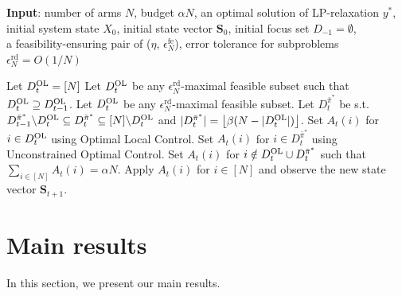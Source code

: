 \documentclass[11pt,letterpaper]{article}
\theoremstyle{plain}
\theoremstyle{definition}
\theoremstyle{remark}
\newcommand{\ve}[1]{\bm{#1}}
\newcommand{\veS}{\ve{S}}
\newcommand{\sumN}{\sum_{i\in[N]}}
\newcommand{\pibar}{{\sysbar{\pi}}}
\newcommand{\pibs}{{\pibar^*}}
\newcommand{\sysbar}[1]{\bar{#1}}
\newcommand{\errfe}{\epsilon_N^{\text{fe}}}
\newcommand{\errtol}{\epsilon_N^{\text{rd}}}
\newcommand{\Da}{D^{\pibs}}
\newcommand{\Db}{D^{\textup{OL}}}
\newcommand{\slk}{\delta}
\begin{document}
\begin{algorithm}[t] 
\caption{Two-Set Policy}
\label{alg:two-set}
\hspace*{\algorithmicindent} \textbf{Input}: number of arms $N$, budget $\alpha N$, an optimal solution of LP-relaxation $y^*$, \\
\hspace*{\algorithmicindent} \hspace{0.37in} initial system state $X_0$, initial state vector $\veS_0$, initial focus set $D_{-1}=\emptyset$, \\
\hspace*{\algorithmicindent} \hspace{0.37in} a feasibility-ensuring pair of ($\eta$, $\errfe$), error tolerance for subproblems $\errtol = O(1/N)$
\begin{algorithmic}[1]
        \If{$\slk(X_t, [N]) \geq 0$} 
        \label{alg:two-set:update-db-step-begin}
            \State Let $\Db_t = [N]$
        \ElsIf{$\slk(X_t, \Db_{t-1}) \geq 0$} 
            \State Let $\Db_t$ be any $\errtol$-maximal feasible subset such that $\Db_t \supseteq \Db_{t-1}$. 
        \Else
            \State Let $\Db_t$ be any $\errtol$-maximal feasible subset. 
        \label{alg:two-set:update-db-step-end}
        \EndIf
        \State Let $\Da_{t}$ be s.t. $\Da_{t-1} \backslash \Db_{t} \subseteq \Da_{t} \subseteq [N] \backslash \Db_t$ and $|\Da_{t}| = \big\lfloor \beta (N -|\Db_{t}|)\big\rfloor$. 
        \State Set $A_t(i)$ for $i\in \Db_{t}$ using  Optimal Local Control. 
        \label{alg:two-set:db-action}
        \State Set $A_t(i)$ for $i\in \Da_{t}$ using  Unconstrained Optimal Control. 
        \label{alg:two-set:da-action}
        \State Set $A_t(i)$ for $i\notin \Db_{t} \cup \Da_{t}$ such that $\sumN A_t(i) = \alpha N$. 
        \label{alg:two-set:remaining-action}
        \State Apply $A_t(i)$ for $i\in[N]$ and observe the new state vector $\veS_{t+1}$. 
    \EndFor
\end{algorithmic}
\end{algorithm}








\section{Main results}

In this section, we present our main results. 
\end{document}
